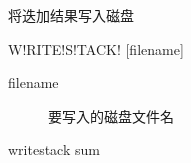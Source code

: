 \label{sss:writestack}

将迭加结果写入磁盘

\begin{SACSTX}
W!RITE!S!TACK! [filename]
\end{SACSTX}

\begin{description}
\item [filename] 要写入的磁盘文件名
\end{description}

\begin{SACDFT}
writestack sum
\end{SACDFT}
